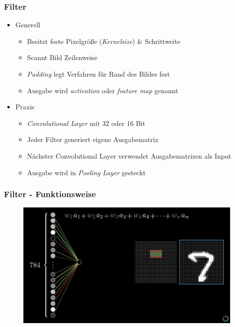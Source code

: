 \begin{frame}
\frametitle{Filter}


\begin{itemize}
\item Generell

\begin{itemize}
	\item Besitzt feste Pixelgröße (\emph{Kernelsize}) \& Schrittweite
	\item Scannt Bild Zeilenweise
	\item \emph{Padding} legt Verfahren für Rand des Bildes fest
	\item Ausgabe wird \emph{activation} oder \emph{feature map} genannt
\end{itemize}

\item Praxis
\begin{itemize}
	\item \emph{Convolutional Layer} mit 32 oder 16 Bit
	\item Jeder Filter generiert eigene Ausgabematrix
	\item Nächster Convolutional Layer verwendet Ausgabematrizen als Input
	\item Ausgabe wird in \emph{Pooling Layer} gesteckt
\end{itemize}

\end{itemize}



\end{frame}


\begin{frame}
\frametitle{Filter - Funktionsweise}

\begin{figure}
	\includegraphics[width=\linewidth]{./aktuelleEntwicklung/convolutionalNN/img/filter}
\end{figure}
\end{frame}



